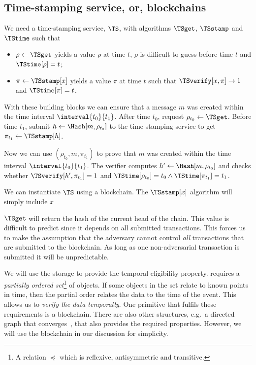 \subsection{Time-stamping service, or, blockchains}%
\label{StorageProperties}


We need a time-stamping service, \(\TS\), with algorithms \(\TSget\), 
\(\TSstamp\) and \(\TStime\) such that
\begin{itemize}
  \item \(\rho \gets \TSget\) yields a value \(\rho\) at time \(t\), \(\rho\) is 
    difficult to guess before time \(t\) and \(\TStime[\rho] = t\);
  \item \(\pi\gets \TSstamp[x]\) yields a value \(\pi\) at time \(t\) such that 
    \(\TSverify[x, \pi]\to 1\) and \(\TStime[\pi] = t\).
\end{itemize}

With these building blocks we can ensure that a message \(m\) was created within 
the time interval \(\interval{t_0}{t_1}\).
After time \(t_0\), request \(\rho_{t_0}\gets \TSget\).
Before time \(t_1\), submit \(h\gets \Hash[m, \rho_{t_0}]\) to the time-stamping 
service to get \(\pi_{t_1}\gets \TSstamp[h]\).

Now we can use \((\rho_{t_0}, m, \pi_{t_1})\) to prove that \(m\) was created 
within the time interval \(\interval{t_0}{t_1}\).
The verifier computes \(h'\gets \Hash[m, \rho_{t_0}]\) and checks whether 
\(\TSverify[h', \pi_{t_1}] = 1\) and \(\TStime[\rho_{t_0}] = t_0\land 
  \TStime[\pi_{t_1}] = t_1\).

We can instantiate \(\TS\) using a blockchain.
The \(\TSstamp[x]\) algorithm will simply include \(x\)

\(\TSget\) will return the hash of the current head of the chain.
This value is difficult to predict since it depends on all submitted 
transactions.
This forces us to make the assumption that the adversary cannot control 
\emph{all} transactions that are submitted to the blockchain.
As long as one non-adversarial transaction is submitted it will be 
unpredictable.

We will use the storage to provide the temporal eligibility property.
 requires a \emph{partially ordered 
  set}\footnote{%
  A relation \(\preceq\) which is reflexive, antisymmetric and transitive.
} of objects.
If some objects in the set relate to known points in time, then the partial 
order relates the data to the time of the event.
This allows us to \emph{verify the data temporally}.
One primitive that fulfils these requirements is a blockchain.
There are also other structures, e.g.\ a directed graph that 
converges~\cite{BlockchainFreeCryptocurrencies}, that also provides the required 
properties.
However, we will use the blockchain in our discussion for simplicity.

